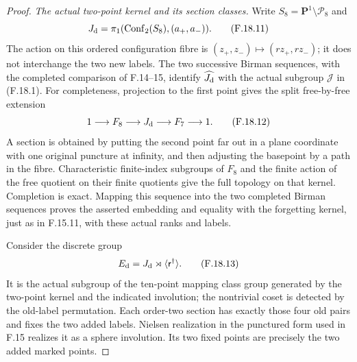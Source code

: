 \begin{proof}
\emph{The actual two-point kernel and its section classes.}
Write $S_8=\mathbf P^1\setminus\mathcal P_8$ and
\[
 J_{\rm d}=\pi_1(\operatorname{Conf}_2(S_8),(a_+,a_-)).
                                                               \tag{F.18.11}
\]
The action on this ordered configuration fibre is
$(z_+,z_-)\mapsto(rz_+,rz_-)$; it does not interchange
the two new labels.
The two successive Birman sequences, with the
completed comparison of F.14--15, identify
$\widehat{J_{\rm d}}$ with the actual subgroup
$\mathcal J$ in (F.18.1).
For completeness, projection to the first point
gives the split free-by-free extension
\[
              1\longrightarrow F_8
                \longrightarrow J_{\rm d}
                \longrightarrow F_7\longrightarrow1 .
                                                               \tag{F.18.12}
\]
A section is obtained by putting the second point
far out in a plane coordinate with one original
puncture at infinity, and then adjusting the
basepoint by a path in the fibre.
Characteristic finite-index subgroups of $F_8$
and the finite action of the free quotient on
their finite quotients give the full topology on
that kernel.  Completion is exact.
Mapping this sequence into the two completed
Birman sequences proves the asserted embedding
and equality with the forgetting kernel, just
as in F.15.11, with these actual ranks and labels.

Consider the discrete group
\[
            E_{\rm d}=J_{\rm d}\rtimes
                             \langle\mathsf r^\dagger\rangle .
                                                               \tag{F.18.13}
\]
It is the actual subgroup of the ten-point mapping
class group generated by the two-point kernel and
the indicated involution; the nontrivial coset is
detected by the old-label permutation.
Each order-two section has exactly those four
old pairs and fixes the two added labels.
Nielsen realization in the punctured form used
in F.15 realizes it as a sphere involution.
Its two fixed points are precisely the two
added marked points.


\end{proof}
